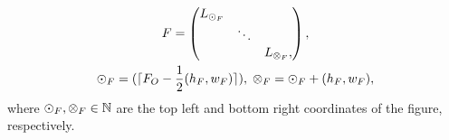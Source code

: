 \begin{equation}
\begin{gathered}
    F = 
    \begin{pmatrix}
        L_{\odot_F} & & \\
         & \ddots & \\
         & &  L_{\otimes_F},
    \end{pmatrix}, \\
    \odot_F = (\lceil F_O - \frac{1}{2} ({h_F}, {w_F})\rceil), \; 
    \otimes_F = \odot_F + ({h_F}, {w_F}),
\end{gathered}
\end{equation}
where $\odot_F, \otimes_F \in \mathbb{N}$ are the top left and bottom right coordinates of the figure, respectively.
